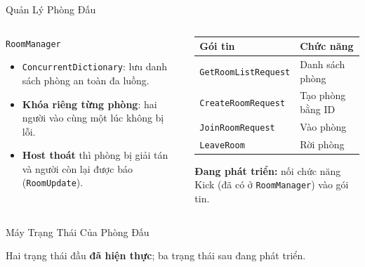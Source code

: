 \begin{frame}{Quản Lý Phòng Đấu}
  \begin{columns}[T]
    \begin{column}{0.50\textwidth}
      \begin{block}{\texttt{RoomManager}}
        \begin{itemize}
          \item \texttt{ConcurrentDictionary}: lưu danh sách phòng an toàn đa luồng.
          \item \textbf{Khóa riêng từng phòng}: hai người vào cùng một lúc không bị lỗi.
          \item \textbf{Host thoát} thì phòng bị giải tán và người còn lại được báo (\texttt{RoomUpdate}).
        \end{itemize}
      \end{block}
    \end{column}
    \begin{column}{0.46\textwidth}
      \footnotesize
      \renewcommand{\arraystretch}{1.25}
      \begin{tabularx}{\textwidth}{@{}Y Y@{}}
        \toprule
        \textbf{Gói tin} & \textbf{Chức năng} \\
        \midrule
        \texttt{GetRoomListRequest} & Danh sách phòng \\
        \texttt{CreateRoomRequest} & Tạo phòng bằng ID \\
        \texttt{JoinRoomRequest} & Vào phòng \\
        \texttt{LeaveRoom} & Rời phòng \\
        \bottomrule
      \end{tabularx}
      \vspace{0.15cm}

      \scriptsize \textbf{Đang phát triển:} nối chức năng Kick (đã có ở \texttt{RoomManager}) vào gói tin.
    \end{column}
  \end{columns}
\end{frame}

\begin{frame}{Máy Trạng Thái Của Phòng Đấu}
  \centering
  \vspace{0.6cm}

  \vspace{0.4cm}
  \footnotesize Hai trạng thái đầu \textbf{đã hiện thực}; ba trạng thái sau đang phát triển.
\end{frame}

